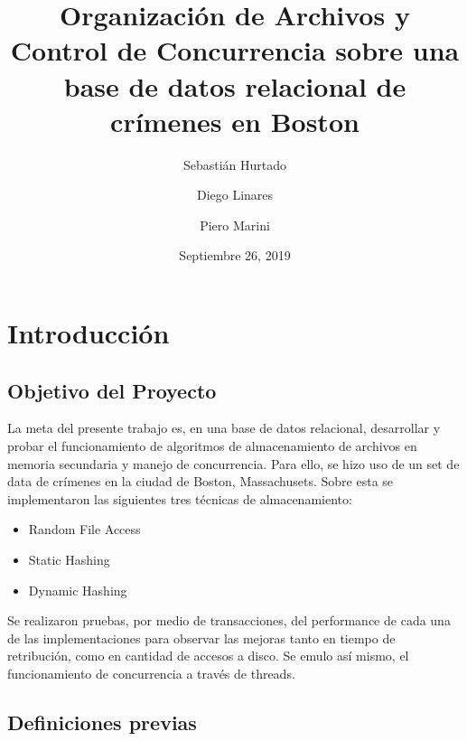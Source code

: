 \documentclass{article}
\title{Organización de Archivos y Control de Concurrencia sobre una base de datos relacional de crímenes en Boston}
\author{Sebastián Hurtado \and Diego Linares \and Piero Marini}
\date{Septiembre 26, 2019}
\begin{document}
  
  \maketitle

  \section{Introducción}
    
    \subsection{Objetivo del Proyecto}
      La meta del presente trabajo es, en una base de datos relacional, desarrollar y probar el funcionamiento de algoritmos de almacenamiento de archivos en memoria secundaria y manejo de concurrencia. Para ello, se hizo uso de un set de data de crímenes en la ciudad de Boston, Massachusets. Sobre esta se implementaron las siguientes tres técnicas de almacenamiento:
      \begin{itemize}
        \item Random File Access
        \item Static Hashing
        \item Dynamic Hashing
      \end{itemize}
      Se realizaron pruebas, por medio de transacciones, del performance de cada una de las implementaciones para observar las mejoras tanto en tiempo de retribución, como en cantidad de accesos a disco. Se emulo así mismo, el funcionamiento de concurrencia a través de threads. 
    
    \subsection{Definiciones previas}  
  
\end{document}
